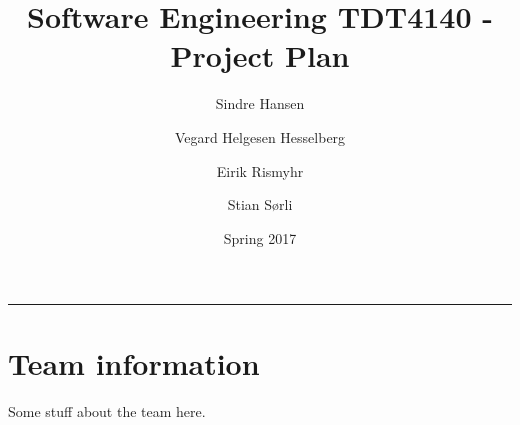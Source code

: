 \documentclass[12pt, a4paper]{article}
\title{Software Engineering TDT4140 - Project Plan}
\author{Sindre Hansen \and Vegard Helgesen Hesselberg \and Eirik Rismyhr \and Stian Sørli}
\date{Spring 2017}
\begin{document}
\maketitle
\rule{\linewidth}{0.5mm}

\section{Team information}
Some stuff about the team here.




\newpage

\end{document}
